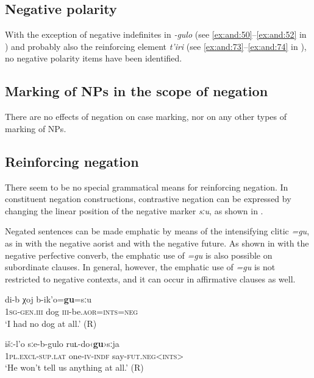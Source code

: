 \documentclass[output=paper,colorlinks=true, citecolor=brown]{langscibook}
\begin{document}
\subsection{Negative polarity} \label{sec:and:4.2}

With the exception of negative indefinites in \textit{{}-gulo} (see \ref{ex:and:50}--\ref{ex:and:52} in ) and probably also the reinforcing element \textit{t’iri} (see \ref{ex:and:73}--\ref{ex:and:74} in ), no negative polarity items have been identified.

\subsection{Marking of NPs in the scope of negation} \label{sec:and:4.3}

There are no effects of negation on case marking, nor on any other types of marking of NPs.

\subsection{Reinforcing negation} \label{sec:and:4.4}

There seem to be no special grammatical means for reinforcing negation. In constituent negation constructions, contrastive negation can be expressed by changing the linear position of the negative marker \textit{sːu}, as shown in .

Negated sentences can be made emphatic by means of the intensifying clitic \textit{=gu}, as in  with the negative aorist and  with the negative future. As shown in  with the negative perfective converb, the emphatic use of \textit{=gu} is also possible on subordinate clauses. In general, however, the emphatic use of \textit{=gu} is not restricted to negative contexts, and it can occur in affirmative clauses as well. 

\ea
    \label{ex:and:68} 
    \gll di-b χoj b-ik’o=\textbf{gu}=sːu\\
          \textsc{1sg}-\textsc{gen.iii} dog \textsc{iii}{}-be.\textsc{aor=ints=neg} \\
    \glt ‘I had no dog at all.’ (R)
\z 

\ea
    \label{ex:and:69}
    \gll išː-l’o sːe-b{}-gulo ruʟ-do‹\textbf{gu}›sːja\\
          \textsc{1pl.excl-sup.lat} one-\textsc{iv}{}-\textsc{indf} say-\textsc{fut.neg<ints>} \\
    \glt ‘He won’t tell us anything at all.’ (R)
\z 
  
\end{document}
